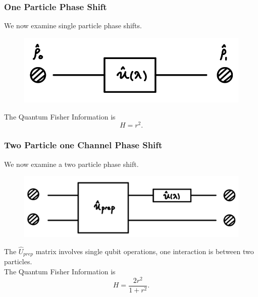 \documentclass{beamer}
\begin{document}
\begin{frame}
\frametitle{One Particle Phase Shift}
We now examine single particle phase shifts.
\begin{figure}
\begin{center}
\includegraphics[width=0.75\linewidth]{One-Particle-QFI.jpg}
\end{center}
\end{figure}
The Quantum Fisher Information is
\begin{equation}\label{eq:32}
H=r^2.
\end{equation}
\end{frame}
\begin{frame}
\frametitle{Two Particle one Channel Phase Shift}
We now examine a two particle phase shift.
\begin{figure}
\begin{center}
\includegraphics[width=0.75\linewidth]{Two-Particle-QFI.jpg}
\end{center}
\end{figure}
The $\hat{U}_{prep}$ matrix involves single qubit operations, one interaction is between two particles. \\ 
\vspace{10pt}
The Quantum Fisher Information is
\begin{equation}\label{eq:33}
H=\frac{2r^2}{1+r^2}.
\end{equation}
\end{frame}
\end{document}
